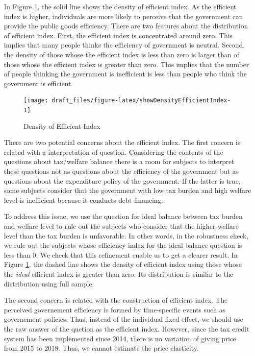 \documentclass[
  11pt,
  a4paper,
]{article}
\begin{document}
  In Figure \ref{fig:showDensityEfficientIndex}, the solid line shows the density of efficient index.
  As the efficient index is higher,
  individuals are more likely to perceive that the government can provide the public goods efficiency.
  There are two features about the distribution of efficient index.
  First, the efficient index is concentrated around zero.
  This implies that many people thinks the efficiency of government is neutral.
  Second, the density of those whose the efficient index is less than zero is larger than of
  those whose the efficient index is greater than zero.
  This implies that the number of people thinking the government is inefficient is
  less than people who think the government is efficient.

  \begin{figure}[t]

  {\centering \texttt{[image: draft\_files/figure-latex/showDensityEfficientIndex-1]} 

  }

  \caption{Density of Efficient Index}\label{fig:showDensityEfficientIndex}
  \end{figure}

  There are two potential concerns about the efficient index.
  The first concern is related with a interpretation of question.
  Considering the contents of the questions about tax/welfare balance
  there is a room for subjects to interpret these questions
  not as questions about the efficiency of the government
  but as questions about the expenditure policy of the government.
  If the latter is true,
  some subjects consider that the government with low tax burden and high welfare level is inefficient because
  it conducts debt financing.

  To address this issue,
  we use the question for ideal balance between tax burden and welfare level
  to rule out the subjects who consider that the higher welfare level than the tax burden is unfavorable.
  In other words, in the robustness check,
  we rule out the subjects whose efficiency index for the ideal balance question is less than 0.
  We check that this refinement enable us to get a clearer result.
  In Figure \ref{fig:showDensityEfficientIndex},
  the dashed line shows the density of efficient index
  using those whose the \emph{ideal} efficient index is greater than zero.
  Its distribution is similar to the distribution using full sample.

  The second concern is related with the construction of efficient index.
  The perceived governement efficiency is formed by time-specific events such as governement policies.
  Thus, instead of the individual fixed effect,
  we should use the raw answer of the quetion as the efficient index.
  However, since the tax credit system has been implemented since 2014,
  there is no variation of giving price from 2015 to 2018.
  Thus, we cannot estimate the price elasticity.
\end{document}
